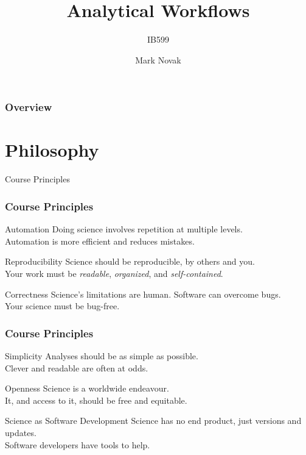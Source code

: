 \documentclass{beamer}
\title[Analytical Workflows] %
{Analytical Workflows}
\subtitle{IB599}
\author[] %
{Mark Novak}
\institute[OSU] %
{
  \inst{}%
  Dept. of Integrative Biology\\
  Oregon State University
}
\date[Fall2020] %
{}
\begin{document}
\frame{\titlepage}

\begin{frame}
    \frametitle{Overview}
    \tableofcontents
\end{frame}


\section{Philosophy}


\begin{frame}{Course Principles}

    \frametitle{Course Principles}

        \begin{block}{Automation}
            Doing science involves repetition at multiple levels.\\Automation is more efficient and reduces mistakes.
        \end{block}

        \begin{block}{Reproducibility}
            Science should be reproducible, by others and you.\\Your work must be \emph{readable}, \emph{organized}, and \emph{self-contained}.
        \end{block}

        \begin{block}{Correctness}
            Science's limitations are human. Software can overcome bugs.\\Your science must be bug-free.
        \end{block}

\end{frame}

\begin{frame}

    \frametitle{Course Principles}

        \begin{block}{Simplicity}
            Analyses should be as simple as possible.\\Clever and readable are often at odds.
        \end{block}

        \begin{block}{Openness}
            Science is a worldwide endeavour.\\It, and access to it, should be free and equitable.
        \end{block}

        \begin{block}{Science as Software Development}
            Science has no end product, just versions and updates.\\Software developers have tools to help.
        \end{block}

\end{frame}
\end{document}
